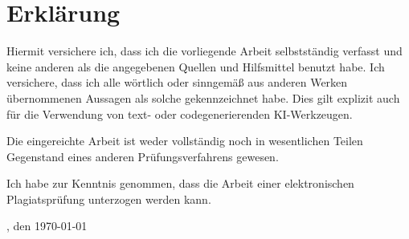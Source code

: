\section*{Erklärung}
\vspace*{0.5cm}
\noindent
Hiermit versichere ich, dass ich die vorliegende Arbeit selbstständig verfasst und keine anderen als die angegebenen Quellen und Hilfsmittel benutzt habe. Ich versichere, dass ich alle wörtlich oder sinngemäß aus anderen Werken übernommenen Aussagen als solche gekennzeichnet habe. Dies gilt explizit auch für die Verwendung von text- oder codegenerierenden KI-Werkzeugen.

Die eingereichte Arbeit ist weder vollständig noch in wesentlichen Teilen Gegenstand eines anderen Prüfungsverfahrens gewesen.

Ich habe zur Kenntnis genommen, dass die Arbeit einer elektronischen Plagiatsprüfung unterzogen werden kann.

\vspace{3cm}
\toponym, den \today